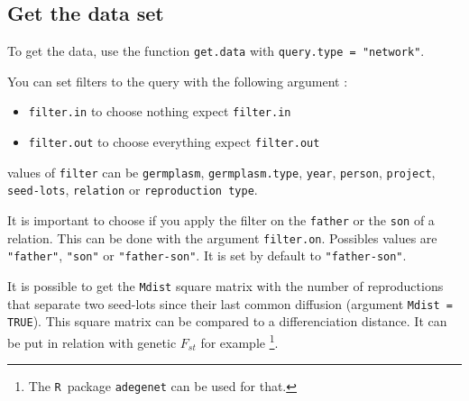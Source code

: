 \documentclass{article}\usepackage[]{graphicx}\usepackage[]{color}
\newcommand{\R}{\texttt{R}}
\renewcommand{\sl}{seed-lots}
\begin{document}
\subsection{Get the data set}

To get the data, use the function \texttt{get.data} with \texttt{query.type = "network"}.

You can set filters to the query with the following argument :

\begin{itemize}
\item \texttt{filter.in} to choose nothing expect \texttt{filter.in}
\item \texttt{filter.out} to choose everything expect \texttt{filter.out}
\end{itemize}

values of \texttt{filter} can be \texttt{germplasm}, \texttt{germplasm.type}, \texttt{year}, \texttt{person}, \texttt{project}, \texttt{\sl}, \texttt{relation} or \texttt{reproduction type}.


It is important to choose if you apply the filter on the \texttt{father} or the \texttt{son} of a relation.
This can be done with the argument \texttt{filter.on}.
Possibles values are \texttt{"father"}, \texttt{"son"} or \texttt{"father-son"}.
It is set by default to \texttt{"father-son"}.

It is possible to get the \texttt{Mdist} square matrix with the number of reproductions that separate two seed-lots since their last common diffusion (argument \texttt{Mdist = TRUE}).
This square matrix can be compared to a differenciation distance. 
It can be put in relation with genetic $F_{st}$ for example \citep{nei_analysis_1973}\footnote{The \R~package \texttt{adegenet} can be used for that.}.
\end{document}
